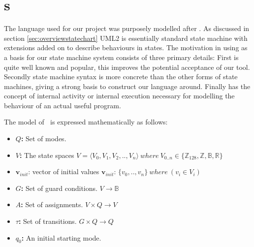 \section{\plcchart s}
\label{sec:statechartsem}

The language used for our project was purposely modelled after \cite{UML2}. As discussed in section \ref{sec:overviewstatechart} UML2 is essentially standard state machine with extensions added on to describe behaviours in states. The motivation in using \cite{UML2} as a basis for our state machine system consists of three primary details: First \cite{UML2} is quite well known and popular, this improves the potential acceptance of our tool. Secondly \cite{UML2} state machine syntax is more concrete than the other forms of state machines, giving a strong basis to construct our language around. Finally \cite{UML2} has the concept of internal activity or internal execution necessary for modelling the behaviour of an actual useful program.

The model of \plcchart $\:$ is expressed mathematically as follows:

\begin{definition}
	\plcchart
	
\begin{itemize}
	\item \textbf{$Q$:} Set of modes.
	\item \textbf{$V$:} The state spaces $V = \langle V_0,V_1,V_2,..,V_n \rangle \: where \: V_{0..n}\in \lbrace \mathbb{Z}_{128}, \mathbb{Z}, \mathbb{B}, \mathbb{R} \rbrace$
	\item $\mathbf{v}_{init}$: vector of initial values $\mathbf{v}_{init}$: $\lbrace v_0,..,v_n \rbrace \: where \: (v_i \in V_i)$
	\item \textbf{$G$:} Set of guard conditions. $V \rightarrow \mathbb{B}$
	\item \textbf{$A$:} Set of assignments. $V \times Q \rightarrow V$
	\item \textbf{$\tau$:} Set of transitions. $G \times Q \rightarrow Q$
	\item \textbf{$q_0$:} An initial starting mode.
\end{itemize}
\end{definition}

